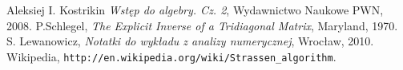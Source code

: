 \begin{thebibliography}{99}
 Aleksiej I. Kostrikin {\it Wstęp do algebry. Cz. 2}, Wydawnictwo Naukowe PWN, 2008.
 P.Schlegel, {\it The Explicit Inverse of a Tridiagonal Matrix}, Maryland, 1970.
   S. Lewanowicz, {\it Notatki do wykładu z analizy numerycznej}, Wrocław, 2010.
 Wikipedia, \verb|http://en.wikipedia.org/wiki/Strassen_algorithm|.
\end{thebibliography}

